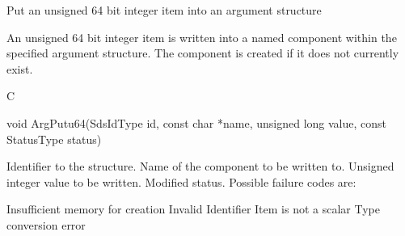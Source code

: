 \begin{manroutinedescription}
      Put an unsigned 64 bit integer item into an argument structure

      An unsigned 64 bit integer item is written into a named component
      within the specified argument structure. The component is created if it
      does not currently exist.

      C

      void ArgPutu64(SdsIdType id, const char *name, unsigned long value, %
const StatusType {\mantt{*}} status)
 
\begin{manparametertable}
 Identifier to the structure.
 Name of the component to be %
written to.
 Unsigned integer %
value to be written.
 Modified status. Possible %
failure codes are:
\end{manparametertable}
\begin{mantwocolumntable}
Insufficient memory for creation
Invalid Identifier
Item is not a scalar
Type conversion error
\end{mantwocolumntable}
\end{manroutinedescription}

